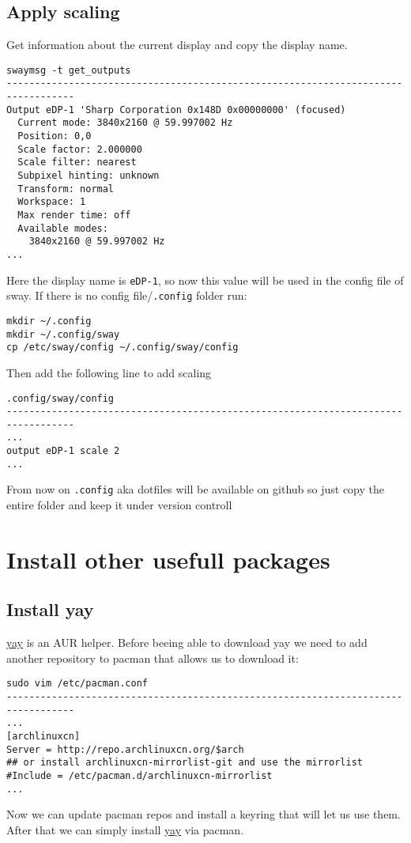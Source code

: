 \documentclass[12pt,A4]{article}
\begin{document}
\subsection{Apply scaling}
Get information about the current display and copy the display name.
\begin{verbatim}
swaymsg -t get_outputs
----------------------------------------------------------------------------------
Output eDP-1 'Sharp Corporation 0x148D 0x00000000' (focused)
  Current mode: 3840x2160 @ 59.997002 Hz
  Position: 0,0
  Scale factor: 2.000000
  Scale filter: nearest
  Subpixel hinting: unknown
  Transform: normal
  Workspace: 1
  Max render time: off
  Available modes:
    3840x2160 @ 59.997002 Hz
...
\end{verbatim}
Here the display name is \texttt{eDP-1}, so now this value will be used in the config file of sway. If there is no config file/\texttt{.config} folder run:
\begin{verbatim}
mkdir ~/.config
mkdir ~/.config/sway
cp /etc/sway/config ~/.config/sway/config
\end{verbatim}
Then add the following line to add scaling
\begin{verbatim}
.config/sway/config
----------------------------------------------------------------------------------
...
output eDP-1 scale 2
...
\end{verbatim}
\begin{tcolorbox}[colback=ArchGreen,sharp corners,boxrule=0.2mm]
From now on \texttt{.config} aka dotfiles will be available on github so just copy the entire folder and keep it under version controll
\end{tcolorbox}

\section{Install other usefull packages}
\subsection{Install yay}
\href{https://github.com/Jguer/yay}{yay} is an AUR helper.
 Before beeing able to download yay we need to add another repository to pacman that allows us to download it:

\begin{verbatim}
sudo vim /etc/pacman.conf
----------------------------------------------------------------------------------
...
[archlinuxcn]
Server = http://repo.archlinuxcn.org/$arch
## or install archlinuxcn-mirrorlist-git and use the mirrorlist
#Include = /etc/pacman.d/archlinuxcn-mirrorlist
...
\end{verbatim}
Now we can update pacman repos and install a keyring that will let us use them. After that we can simply install \href{https://github.com/Jguer/yay}{yay} via pacman.
\end{document}
